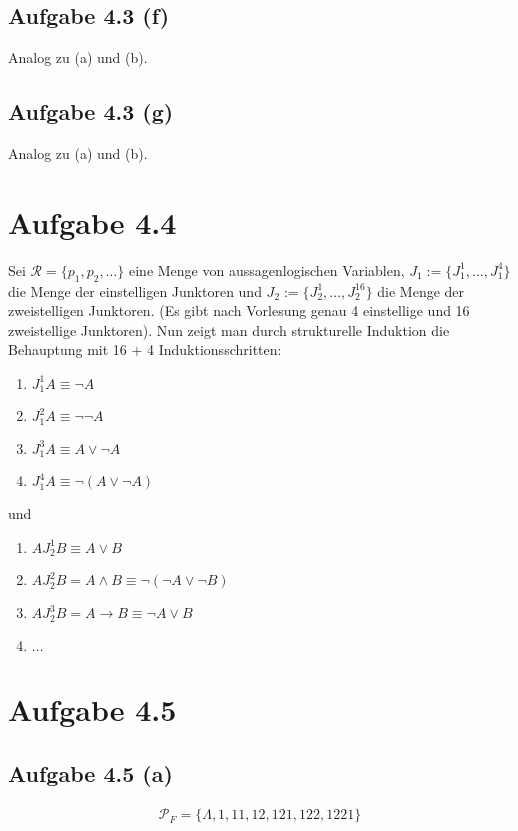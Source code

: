 \documentclass[12pt,a4paper]{article}
\begin{document}
\subsection*{Aufgabe 4.3 (f)}
Analog zu (a) und (b).

\subsection*{Aufgabe 4.3 (g)}
Analog zu (a) und (b).

\section*{Aufgabe 4.4}
Sei $\mathcal{R}=\lbrace p_1,p_2,\ldots\rbrace$ eine Menge von aussagenlogischen Variablen, $J_1:=\lbrace J_1^1,\ldots,J_1^4\rbrace$ die Menge der einstelligen Junktoren und $J_2:=\lbrace J_2^1,\ldots,J_2^{16}\rbrace$ die Menge der zweistelligen Junktoren. (Es gibt nach Vorlesung genau 4 einstellige und 16 zweistellige Junktoren). Nun zeigt man durch strukturelle Induktion die Behauptung mit 16 + 4 Induktionsschritten:
\begin{enumerate}
\item $J_1^1 A\equiv\neg A$
\item $J_1^2 A\equiv\neg\neg A$
\item $J_1^3 A\equiv A\vee\neg A$
\item $J_1^4 A\equiv\neg(A\vee\neg A)$
\end{enumerate}
und
\begin{enumerate}
\item $A J_2^1 B\equiv A\vee B$
\item $A J_2^2 B=A\wedge B\equiv\neg(\neg A\vee\neg B)$
\item $A J_2^3 B=A\to B\equiv\neg A\vee B$
\item $\ldots$
\end{enumerate}

\section*{Aufgabe 4.5}
\subsection*{Aufgabe 4.5 (a)}
\begin{align*}
\mathcal{P}_F=\lbrace\Lambda,1,11,12,121,122,1221\rbrace
\end{align*}
\end{document}
